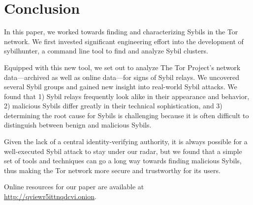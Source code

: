 \section{Conclusion}
\label{sec:conclusion}
In this paper, we worked towards finding and characterizing Sybils in the Tor
network.  We first invested significant engineering effort into the development
of sybilhunter, a command line tool to find and analyze Sybil clusters.

Equipped with this new tool, we set out to analyze The Tor Project's network
data---archived as well as online data---for signs of Sybil relays.  We
uncovered several Sybil groups and gained new insight into real-world Sybil
attacks.  We found that 1) Sybil relays frequently look alike in their
appearance and behavior, 2) malicious Sybils differ greatly in their technical
sophistication, and 3) determining the root cause for Sybils is challenging
because it is often difficult to distinguish between benign and malicious
Sybils.

Given the lack of a central identity-verifying authority, it is always possible
for a well-executed Sybil attack to stay under our radar, but we found that a
simple set of tools and techniques can go a long way towards finding malicious
Sybils, thus making the Tor network more secure and trustworthy for its users.

Online resources for our paper are available at \\
\url{http://qviewr5ittnqdcvi.onion}.
